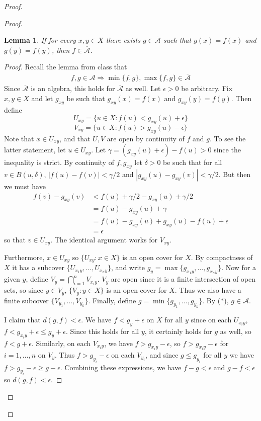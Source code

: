 \documentclass[12pt, a4paper]{book}
\newtheorem{lemma}[theorem]{Lemma}
\theoremstyle{nonumberplain}
\newtheorem{proof}{Proof}
\begin{document}
\begin{proof}
\begin{proof}
\begin{lemma}
    If for every $x,y\in X$ there exists $g\in\overline{\mathcal{A}}$ such that $g(x)=f(x)$ and $g(y)=f(y)$, then $f\in\overline{\mathcal{A}}$.
\end{lemma}
\begin{proof}
    Recall the lemma from class that
    \begin{align*}
        f,g\in\mathcal{A}\Rightarrow\min\{f,g\},\max\{f,g\}\in\overline{\mathcal{A}}\tag{$*$}
    \end{align*}
    Since $\overline{\mathcal{A}}$ is an algebra, this holds for $\overline{\mathcal{A}}$ as well.
    Let $\epsilon>0$ be arbitrary.
    Fix $x,y\in X$ and let $g_{xy}$ be such that $g_{xy}(x)=f(x)$ and $g_{xy}(y)=f(y)$.
    Then define
    \[U_{xy}=\{u\in X:f(u)<g_{xy}(u)+\epsilon\}\]
    \[V_{xy}=\{u\in X:f(u)>g_{xy}(u)-\epsilon\}\]
    Note that $x\in U_{xy}$, and that $U,V$ are open by continuity of $f$ and $g$.
    To see the latter statement, let $u\in U_{xy}$.
    Let $\gamma=(g_{xy}(u)+\epsilon)-f(u)>0$ since the inequality is strict.
    By continuity of $f,g_{xy}$ let $\delta>0$ be such that for all $v\in B(u,\delta)$, $|f(u)-f(v)|<\gamma/2$ and $|g_{xy}(u)-g_{xy}(v)|<\gamma/2$.
    But then we must have
    \begin{align*}
        f(v)-g_{xy}(v) &< f(u)+\gamma/2-g_{xy}(u)+\gamma/2\\
                       &= f(u)-g_{xy}(u)+\gamma\\
                       &= f(u)-g_{xy}(u)+g_{xy}(u)-f(u)+\epsilon\\
                       &= \epsilon
    \end{align*}
    so that $v\in U_{xy}$.
    The identical argument works for $V_{xy}$.

    Furthermore, $x\in U_{xy}$ so $\{U_{xy}:x\in X\}$ is an open cover for $X$.
    By compactness of $X$ it has a subcover $\{U_{x_1y},\ldots,U_{x_ny}\}$, and write $g_y=\max\{g_{x_1y},\ldots,g_{x_ny}\}$.
    Now for a given $y$, define $V_y=\bigcap\limits_{i=1}^n V_{x_iy}$.
    $V_y$ are open since it is a finite intersection of open sets, so since $y\in V_y$, $\{V_y:y\in X\}$ is an open cover for $X$.
    Thus we also have a finite subcover $\{V_{y_1},\ldots,V_{y_k}\}$.
    Finally, define $g=\min\{g_{y_1},\ldots,g_{y_k}\}$.
    By ($*$), $g\in\mathcal{\overline{A}}$.

    I claim that $d(g,f)<\epsilon$.
    We have $f<g_y+\epsilon$ on $X$ for all $y$ since on each $U_{x_iy}$, $f<g_{x_iy}+\epsilon\leq g_y+\epsilon$.
    Since this holds for all $y$, it certainly holds for $g$ as well, so $f<g+\epsilon$.
    Similarly, on each $V_{x_iy}$, we have $f>g_{x_iy}-\epsilon$, so $f>g_{x_iy}-\epsilon$ for $i=1,\ldots,n$ on $V_y$.
    Thus $f>g_{y_i}-\epsilon$ on each $V_{y_i}$, and since $g\leq g_{y_i}$ for all $y$ we have $f>g_{y_i}-\epsilon\geq g-\epsilon$.
    Combining these expressions, we have $f-g<\epsilon$ and $g-f<\epsilon$ so $d(g,f)<\epsilon$.


\end{proof}
\end{proof}
\end{proof}
\end{document}
